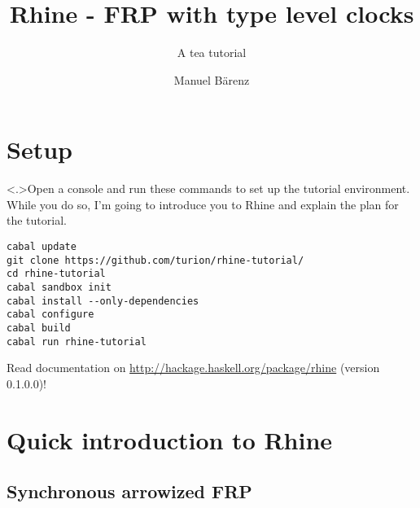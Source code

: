 \documentclass{enigtex-beamer-base}
\title{Rhine - FRP with type level clocks}
\subtitle{A tea tutorial}
\author{Manuel Bärenz}
\begin{document}
\begin{frame}
\titlepage
\end{frame}

\section{Setup}

\begin{frame}[fragile]
\note<.>{Open a console and run these commands to set up the tutorial environment.
While you do so, I'm going to introduce you to Rhine and explain the plan for the tutorial.}
\begin{verbatim}
cabal update
git clone https://github.com/turion/rhine-tutorial/
cd rhine-tutorial
cabal sandbox init
cabal install --only-dependencies
cabal configure
cabal build
cabal run rhine-tutorial
\end{verbatim}
Read documentation on \href{http://hackage.haskell.org/package/rhine}{http://hackage.haskell.org/package/rhine} (version 0.1.0.0)!
\end{frame}


\section{Quick introduction to Rhine}

\subsection{Synchronous arrowized FRP}
\end{document}
